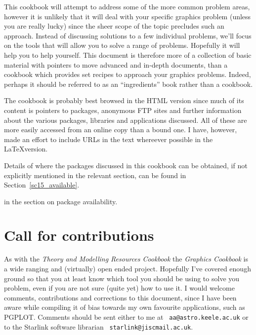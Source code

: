 \documentclass[twoside,11pt]{article}
\newcommand{\htmladdnormallink}[2]{#1}
\newcommand{\htmlref}[2]{#1}
\newcommand{\latex}[1]{#1}
\newcommand{\xref}[3]{#1}
\newcommand{\xlabel}[1]{}
\begin{document}
This cookbook will attempt to address some of the more common problem
areas, however it is unlikely that it will deal with your specific
graphics problem (unless you are really lucky) since the sheer scope
of the topic precludes such an approach. Instead of discussing
solutions to a few individual problems, we'll focus on the tools that
will allow you to solve a range of problems. Hopefully it will help
you to help yourself. This document is therefore more of a collection
of basic material with pointers to move advanced and in-depth
documents, than a cookbook which provides set recipes to approach your
graphics problems. Indeed, perhaps it should be referred to as an
``ingredients'' book rather than a cookbook.

The cookbook is probably best browsed in the HTML version since much
of its content is pointers to packages, anonymous FTP sites and
further information about the various packages, libraries and
applications discussed. All of these are more easily accessed from an
online copy than a bound one. I have, however, made an effort to
include URLs in the text whereever possible in the \LaTeX version.

Details of where the packages discussed in this cookbook can be
obtained, if not explicitly mentioned in the relevant section, can be
found \latex{ in Section~\ref{sc15_available}.}
\begin{htmlonly}
in the section on \htmlref{package availability}{sc15_available}.
\end{htmlonly}

\section{\xlabel{sc15_call}Call for contributions\label{sc15_call}}

As with the \xref{{\em Theory and Modelling Resources
Cookbook}}{sc13}{} the {\em Graphics Cookbook} is a wide ranging and
(virtually) open ended project. Hopefully I've covered enough ground
so that you at least know which tool you should be using to solve you
problem, even if you are not sure (quite yet) how to use it. I would
welcome comments, contributions and corrections to this document,
since I have been aware while compiling it of bias towards my own
favourite applications, such as PGPLOT. Comments should be sent either
to me at \htmladdnormallink{{\tt
aa@astro.keele.ac.uk}}{mailto:aa@astro.keele.ac.uk} or to the Starlink
software librarian \htmladdnormallink{{\tt
starlink@jiscmail.ac.uk}}{mailto:starlink@jiscmail.ac.uk}.
\end{document}
